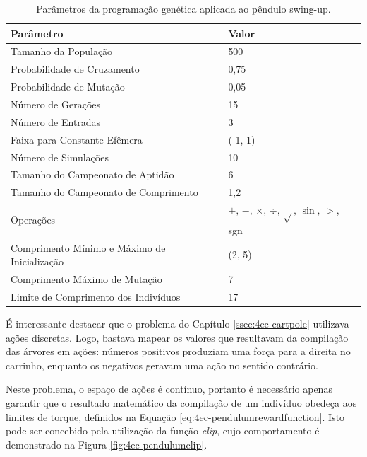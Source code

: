 \begin{table}[H]
	\centering
	\begin{tabular}{l|l} \toprule
		{Parâmetro} & {Valor} \\ \midrule
		{Tamanho da População} & {500} \\
		{Probabilidade de Cruzamento} & {0,75} \\
		{Probabilidade de Mutação} & {0,05} \\
		{Número de Gerações} & {15} \\
		{Número de Entradas} & {3} \\
		{Faixa para Constante Efêmera} & {(-1, 1)} \\
		{Número de Simulações} & {10} \\
		{Tamanho do Campeonato de Aptidão} & {6} \\
		{Tamanho do Campeonato de Comprimento} & {1,2} \\
		{Operações} & {$+,\,-,\,\times,\,\div,\,\sqrt{},\,\sin,\,>$, sgn} \\
		{Comprimento Mínimo e Máximo de Inicialização} & {(2, 5)} \\
		{Comprimento Máximo de Mutação} & {7} \\
		{Limite de Comprimento dos Indivíduos} & {17} \\
		\bottomrule
	\end{tabular}
	\caption{Parâmetros da programação genética aplicada ao pêndulo swing-up.}\label{tab:4ec-pendulumparam}
\end{table}

É interessante destacar que o problema do Capítulo \ref{ssec:4ec-cartpole} utilizava ações discretas. Logo, bastava mapear os valores que resultavam da compilação das árvores em ações: números positivos produziam uma força para a direita no carrinho, enquanto os negativos geravam uma ação no sentido contrário.

Neste problema, o espaço de ações é contínuo, portanto é necessário apenas garantir que o resultado matemático da compilação de um indivíduo obedeça aos limites de torque, definidos na Equação \ref{eq:4ec-pendulumrewardfunction}. Isto pode ser concebido pela utilização da função \textit{clip}, cujo comportamento é demonstrado na Figura \ref{fig:4ec-pendulumclip}.

